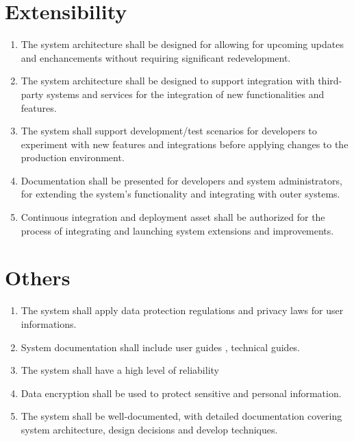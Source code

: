 \documentclass[a4paper,12pt]{report}
\begin{document}
	\section{Extensibility}
		\begin{enumerate}
			\item The system architecture shall be designed for allowing for upcoming updates and enchancements without requiring significant redevelopment.
          
			\item The system architecture shall be designed to support integration with third-party systems and services for the integration of new 
                 functionalities and features.
          
			\item The system shall support  development/test scenarios for developers to experiment with new features and integrations before applying changes to the production environment.
          
			\item Documentation shall be presented for developers and system administrators,  for extending the system's functionality and integrating with outer systems.
          
			\item Continuous integration and deployment asset shall be authorized for the process of integrating and launching system extensions and improvements.
		 \end{enumerate}
	\section{Others}
		\begin{enumerate}
			\item The system shall apply data protection regulations and privacy laws for user informations. 
	       
			\item System documentation shall include user guides , technical guides. 
	       
	        \item The system shall have a high level of reliability
	       
	        \item Data encryption shall be used to protect sensitive and personal information.
	       
	        \item The system shall be well-documented, with detailed documentation covering system architecture, design decisions and develop techniques.

		\end{enumerate}
\end{document}
